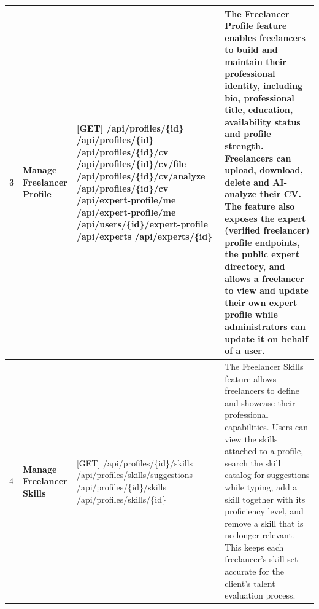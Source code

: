 \begin{longtable}{|C{0.7cm}|L{2.6cm}|S{6.6cm}|L{5.2cm}|}
3
&
\textbf{Manage Freelancer Profile}
&
[GET] /\allowbreak{}api/\allowbreak{}profiles/\allowbreak{}\{id\} \newline
[PUT] /\allowbreak{}api/\allowbreak{}profiles/\allowbreak{}\{id\} \newline
[POST] /\allowbreak{}api/\allowbreak{}profiles/\allowbreak{}\{id\}/\allowbreak{}cv \newline
[GET] /\allowbreak{}api/\allowbreak{}profiles/\allowbreak{}\{id\}/\allowbreak{}cv/\allowbreak{}file \newline
[POST] /\allowbreak{}api/\allowbreak{}profiles/\allowbreak{}\{id\}/\allowbreak{}cv/\allowbreak{}analyze \newline
[DELETE] /\allowbreak{}api/\allowbreak{}profiles/\allowbreak{}\{id\}/\allowbreak{}cv \newline
[GET] /\allowbreak{}api/\allowbreak{}expert-profile/\allowbreak{}me \newline
[PUT] /\allowbreak{}api/\allowbreak{}expert-profile/\allowbreak{}me \newline
[PATCH] /\allowbreak{}api/\allowbreak{}users/\allowbreak{}\{id\}/\allowbreak{}expert-profile \newline
[GET] /\allowbreak{}api/\allowbreak{}experts \newline
[GET] /\allowbreak{}api/\allowbreak{}experts/\allowbreak{}\{id\}
&
The Freelancer Profile feature enables freelancers to build and maintain their professional identity, including bio, professional title, education, availability status and profile strength. Freelancers can upload, download, delete and AI-analyze their CV. The feature also exposes the expert (verified freelancer) profile endpoints, the public expert directory, and allows a freelancer to view and update their own expert profile while administrators can update it on behalf of a user.
\\ \hline

4
&
\textbf{Manage Freelancer Skills}
&
[GET] /\allowbreak{}api/\allowbreak{}profiles/\allowbreak{}\{id\}/\allowbreak{}skills \newline
[GET] /\allowbreak{}api/\allowbreak{}profiles/\allowbreak{}skills/\allowbreak{}suggestions \newline
[POST] /\allowbreak{}api/\allowbreak{}profiles/\allowbreak{}\{id\}/\allowbreak{}skills \newline
[DELETE] /\allowbreak{}api/\allowbreak{}profiles/\allowbreak{}skills/\allowbreak{}\{id\}
&
The Freelancer Skills feature allows freelancers to define and showcase their professional capabilities. Users can view the skills attached to a profile, search the skill catalog for suggestions while typing, add a skill together with its proficiency level, and remove a skill that is no longer relevant. This keeps each freelancer's skill set accurate for the client's talent evaluation process.
\\ \hline


\end{longtable}
